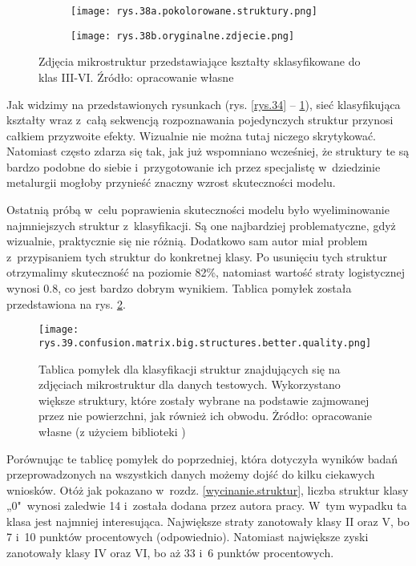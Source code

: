 \begin{figure}[!h]
	\centering
	\begin{subfigure}{0.41\textwidth}
	    \centering
	    \texttt{[image: rys.38a.pokolorowane.struktury.png]}
	\end{subfigure}
	\begin{subfigure}{0.41\textwidth}
	    \centering
	    \texttt{[image: rys.38b.oryginalne.zdjecie.png]}
	\end{subfigure}
	\caption{\label{rys.38}Zdjęcia mikrostruktur przedstawiające kształty sklasyfikowane do klas III-VI. Źródło: opracowanie własne}
\end{figure}
Jak widzimy na przedstawionych rysunkach (rys. \ref{rys.34} – \ref{rys.38}), sieć klasyfikująca kształty wraz z~całą sekwencją rozpoznawania pojedynczych struktur przynosi całkiem przyzwoite efekty. Wizualnie nie można tutaj niczego skrytykować. Natomiast często zdarza się tak, jak już wspomniano wcześniej, że struktury te są bardzo podobne do siebie i~przygotowanie ich przez specjalistę w~dziedzinie metalurgii mogłoby przynieść znaczny wzrost skuteczności modelu.

Ostatnią próbą w~celu poprawienia skuteczności modelu było wyeliminowanie najmniejszych struktur z~klasyfikacji. Są one najbardziej problematyczne, gdyż wizualnie, praktycznie się nie różnią. Dodatkowo sam autor miał problem z~przypisaniem tych struktur do konkretnej klasy. Po usunięciu tych struktur otrzymalimy skuteczność na poziomie 82\%, natomiast wartość straty logistycznej wynosi $0.8$, co jest bardzo dobrym wynikiem. Tablica pomyłek została przedstawiona na rys. \ref{rys.39.confusion.matrix.big.structures.png}. 
\begin{figure}[h]
    \centering
    \texttt{[image: rys.39.confusion.matrix.big.structures.better.quality.png]}  %
    \caption{Tablica pomyłek dla klasyfikacji struktur znajdujących się na zdjęciach mikrostruktur dla danych testowych. Wykorzystano większe struktury, które zostały wybrane na podstawie zajmowanej przez nie powierzchni, jak również ich obwodu. Żródło: opracowanie własne (z użyciem biblioteki )}
    \label{rys.39.confusion.matrix.big.structures.png}
\end{figure}
Porównując te tablicę pomyłek do poprzedniej, która dotyczyła wyników badań przeprowadzonych na wszystkich danych możemy dojść do kilku ciekawych wniosków. Otóż jak pokazano w~rozdz. \ref{wycinanie.struktur}, liczba struktur klasy „0"~wynosi zaledwie 14 i~została dodana przez autora pracy. W~tym wypadku ta klasa jest najmniej interesująca. 
Największe straty zanotowały klasy II oraz V, bo 7 i~10 punktów procentowych (odpowiednio). Natomiast największe zyski zanotowały klasy IV oraz VI, bo aż 33 i~6 punktów procentowych.


